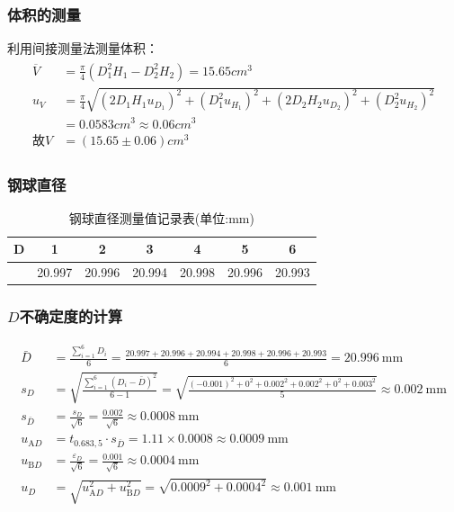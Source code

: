 \documentclass[12pt,a4paper]{article}
\begin{document}
	
	\subsubsection*{体积的测量}
	利用间接测量法测量体积：
	\begin{align*}
		\begin{aligned}
			\overline{V}&=\frac{\pi}{4}(D_{1}^{2}H_{1}-D_{2}^{2}H_{2}) = 15.65cm^3\\
			u_{V}&=\frac{\pi}{4}\sqrt{(2D_{1}H_{1}u_{D_{1}})^{2}+(D_{1}^{2}u_{H_{1}})^{2}+(2D_{2}H_{2}u_{D_{2}})^{2}+(D_{2}^{2}u_{H_{2}})^{2}}\\
			&=0.0583cm^3 \approx 0.06cm^3\\
			\text{故}V &= (15.65\pm 0.06)cm^3
		\end{aligned}
	\end{align*}
	\subsubsection*{钢球直径}
	\begin{table}[H]
		\centering
		\caption{钢球直径测量值记录表(单位:mm)}
		\begin{tabular}{c|c|c|c|c|c|c}
			\toprule
			D & 1 & 2 & 3 & 4 & 5 & 6 \\
			\hline
            & 20.997 &20.996&20.994&20.998&20.996&20.993\\
			\bottomrule
		\end{tabular}
	\end{table}
	
	\vspace*{-0.75cm}

	\subsubsection*{$D$不确定度的计算}
	\begin{align*}
		\bar{D} &= \frac{\sum_{i=1}^{6} D_i}{6} = \frac{20.997 + 20.996 + 20.994 + 20.998 + 20.996 + 20.993}{6} = 20.996\ \text{mm} \\[6pt]
		s_D &= \sqrt{\frac{\sum_{i=1}^{6} (D_i - \bar{D})^2}{6-1}} = \sqrt{\frac{(-0.001)^2 + 0^2 + 0.002^2 + 0.002^2 + 0^2 + 0.003^2}{5}} \approx 0.002\ \text{mm} \\[6pt]
		s_{\bar{D}} &= \frac{s_D}{\sqrt{6}} = \frac{0.002}{\sqrt{6}} \approx 0.0008\ \text{mm} \\[6pt]
		u_{\text{A}D} &= t_{0.683,5} \cdot s_{\bar{D}} = 1.11 \times 0.0008 \approx 0.0009\ \text{mm} \\[6pt]
		u_{\text{B}D} &= \frac{\varepsilon_D}{\sqrt{6}} = \frac{0.001}{\sqrt{6}} \approx 0.0004\ \text{mm} \\[6pt]
		u_D &= \sqrt{u_{\text{A}D}^2 + u_{\text{B}D}^2} = \sqrt{0.0009^2 + 0.0004^2} \approx 0.001\ \text{mm}
	\end{align*}
	
\end{document}
